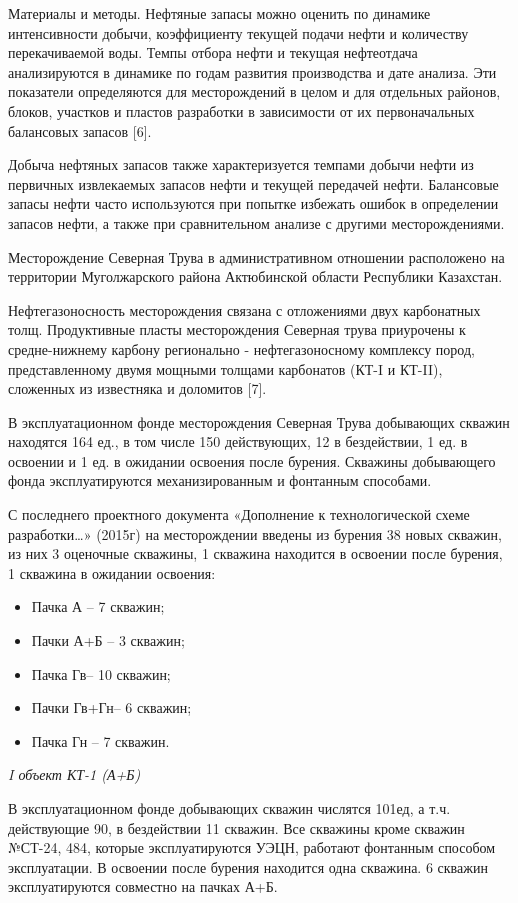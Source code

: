 Материалы и методы. Нефтяные запасы можно оценить по динамике
интенсивности добычи, коэффициенту текущей подачи нефти и количеству
перекачиваемой воды. Темпы отбора нефти и текущая нефтеотдача
анализируются в динамике по годам развития производства и дате анализа.
Эти показатели определяются для месторождений в целом и для отдельных
районов, блоков, участков и пластов разработки в зависимости от их
первоначальных балансовых запасов {[}6{]}.

Добыча нефтяных запасов также характеризуется темпами добычи нефти из
первичных извлекаемых запасов нефти и текущей передачей нефти.
Балансовые запасы нефти часто используются при попытке избежать ошибок в
определении запасов нефти, а также при сравнительном анализе с другими
месторождениями.

Месторождение Северная Трува в административном отношении расположено на
территории Муголжарского района Актюбинской области Республики
Казахстан.

Нефтегазоносность месторождения связана с отложениями двух карбонатных
толщ. Продуктивные пласты месторождения Северная трува приурочены к
средне-нижнему карбону регионально - нефтегазоносному комплексу пород,
представленному двумя мощными толщами карбонатов (КТ-I и КТ-II),
сложенных из известняка и доломитов {[}7{]}.

В эксплуатационном фонде месторождения Северная Трува добывающих скважин
находятся 164 ед., в том числе 150 действующих, 12 в бездействии, 1 ед.
в освоении и 1 ед. в ожидании освоения после бурения. Скважины
добывающего фонда эксплуатируются механизированным и фонтанным
способами.

С последнего проектного документа «Дополнение к технологической схеме
разработки\ldots» (2015г) на месторождении введены из бурения 38 новых
скважин, из них 3 оценочные скважины, 1 скважина находится в освоении
после бурения, 1 скважина в ожидании освоения:

\begin{itemize}
\item
  Пачка А -- 7 скважин;
\item
  Пачки А+Б -- 3 скважин;
\item
  Пачка Гв-- 10 скважин;
\item
  Пачки Гв+Гн-- 6 скважин;
\item
  Пачка Гн -- 7 скважин.
\end{itemize}

\emph{I объект КТ-1 (А+Б)}

В эксплуатационном фонде добывающих скважин числятся 101ед, а т.ч.
действующие 90, в бездействии 11 скважин. Все скважины кроме скважин
№СТ-24, 484, которые эксплуатируются УЭЦН, работают фонтанным способом
эксплуатации. В освоении после бурения находится одна скважина. 6
скважин эксплуатируются совместно на пачках А+Б.

